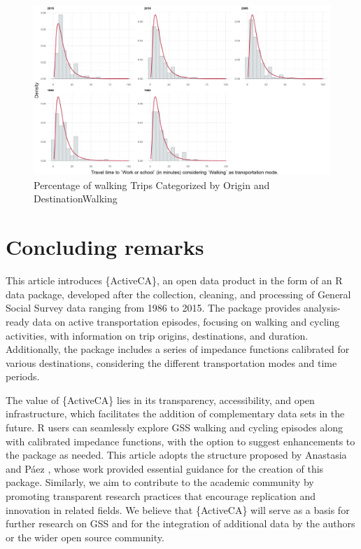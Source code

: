 \documentclass[Royal,times,sageh]{sagej}
\begin{document}
\begin{figure}

{\centering \includegraphics[width=1\linewidth]{Manuscript-figures/impf_Work or school_Walking} 

}

\caption{Percentage of walking Trips Categorized by Origin and DestinationWalking}\label{fig:figure-03}
\end{figure}

\hypertarget{concluding-remarks}{%
\section{Concluding remarks}\label{concluding-remarks}}

This article introduces \{ActiveCA\}, an open data product in the form
of an R data package, developed after the collection, cleaning, and
processing of General Social Survey data ranging from 1986 to 2015. The
package provides analysis-ready data on active transportation episodes,
focusing on walking and cycling activities, with information on trip
origins, destinations, and duration. Additionally, the package includes
a series of impedance functions calibrated for various destinations,
considering the different transportation modes and time periods.

The value of \{ActiveCA\} lies in its transparency, accessibility, and
open infrastructure, which facilitates the addition of complementary
data sets in the future. R users can seamlessly explore GSS walking and
cycling episodes along with calibrated impedance functions, with the
option to suggest enhancements to the package as needed. This article
adopts the structure proposed by Anastasia and Páez
\citeyearpar{soukhov2023}, whose work provided essential guidance for
the creation of this package. Similarly, we aim to contribute to the
academic community by promoting transparent research practices that
encourage replication and innovation in related fields. We believe that
\{ActiveCA\} will serve as a basis for further research on GSS and for
the integration of additional data by the authors or the wider open
source community.
\end{document}
